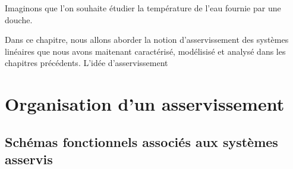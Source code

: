 Imaginons que l'on souhaite étudier la température de l'eau 
fournie par une douche. 



Dans ce chapitre, nous allons aborder la notion d'asservissement des 
systèmes linéaires que nous avons maitenant caractérisé, modélisisé et
analysé dans les chapitres précédents.
L'idée d'asservissement 







\section{Organisation d'un asservissement}

\subsection{Schémas fonctionnels associés aux systèmes asservis}

